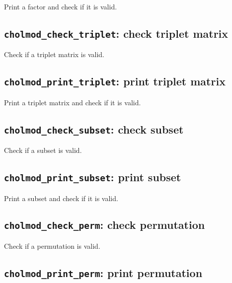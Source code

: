 \documentclass[11pt]{article}
\begin{document}

Print a factor and check if it is valid.

\newpage \subsection{{\tt cholmod\_check\_triplet}: check triplet matrix}


Check if a triplet matrix is valid.

\subsection{{\tt cholmod\_print\_triplet}: print triplet matrix}


Print a triplet matrix and check if it is valid.

\newpage \subsection{{\tt cholmod\_check\_subset}: check subset}


Check if a subset is valid.

\subsection{{\tt cholmod\_print\_subset}: print subset}


Print a subset and check if it is valid.

\newpage \subsection{{\tt cholmod\_check\_perm}: check permutation}


Check if a permutation is valid.

\subsection{{\tt cholmod\_print\_perm}: print permutation}
\end{document}
